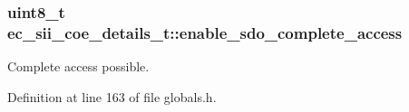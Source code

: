 \subsubsection[{enable\-\_\-sdo\-\_\-complete\-\_\-access}]{\setlength{\rightskip}{0pt plus 5cm}uint8\-\_\-t ec\-\_\-sii\-\_\-coe\-\_\-details\-\_\-t\-::enable\-\_\-sdo\-\_\-complete\-\_\-access}\label{structec__sii__coe__details__t_a8b34817a87dbb31e79d076b67ea3d1be}


Complete access possible. 



Definition at line 163 of file globals.\-h.

